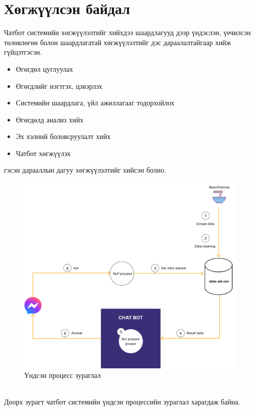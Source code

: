 \section{Хөгжүүлсэн байдал}
Чатбот системийн хөгжүүлэлтийг хийхдээ шаардлагууд дээр үндэслэн, үечилсэн төлөвлөгөө болон шаардлагатай хөгжүүлэлтийг дэс дараалалтайгаар хийж гүйцэтгэсэн.
\begin{itemize}
  \item Өгөгдөл цуглуулах
  \item Өгөгдлийг нэгтгэх, цэвэрлэх
  \item Системийн шаардлага, үйл ажиллагааг тодорхойлох
  \item Өгөгдөлд анализ хийх
  \item Эх хэлний боловсруулалт хийх
  \item Чатбот хөгжүүлэх
\end{itemize}
гэсэн дарааллын дагуу хөгжүүлэлтийг хийсэн болно.
\begin{figure}[ht]
  \centering
  \includegraphics[width = \textwidth]{images/mainProcess.png}
  \caption{Үндсэн процесс зураглал}
\end{figure}
\\Доорх зурагт чатбот системийн үндсэн процессийн зураглал харагдаж байна. 

\newpage
